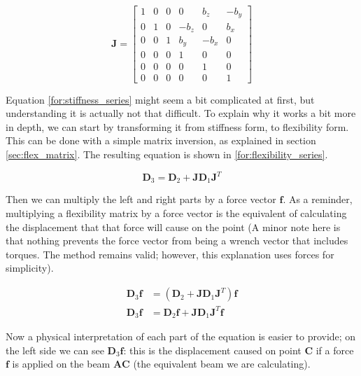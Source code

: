 \begin{equation}
\mathbf{J} = \begin{bmatrix}
1 & 0 & 0 & 0 & b_z & -b_y \\
0 & 1 & 0 & -b_z & 0 & b_x \\
0 & 0 & 1 & b_y & -b_x & 0 \\
0 & 0 & 0 & 1 & 0 & 0 \\
0 & 0 & 0 & 0 & 1 & 0 \\
0 & 0 & 0 & 0 & 0 & 1
\end{bmatrix}
\label{for:stiffness_jac}
\end{equation}


Equation \ref{for:stiffness_series} might seem a bit complicated at first, but understanding it is actually
not that difficult. To explain why it works a bit more in depth, we can start by transforming it 
from stiffness form, to flexibility form. This can be done with a simple matrix inversion, as explained
in section \ref{sec:flex_matrix}. The resulting equation is shown in \ref{for:flexibility_series}.

\begin{equation}
\mathbf{D}_3 = \mathbf{D}_2 + \mathbf{J} \mathbf{D}_1 \mathbf{J}^T
\label{for:flexibility_series}
\end{equation}

\noindent
Then we can multiply the left and right parts by a force vector $\mathbf{f}$. As a reminder, multiplying
a flexibility matrix by a force vector is the equivalent of calculating the displacement that that force
will cause on the point (A minor note here is that nothing prevents the force vector from being a wrench 
vector that includes torques. The method remains valid; however, this explanation uses forces for simplicity).

\begin{equation}
\begin{split}
\mathbf{D}_3 \mathbf{f} &= (\mathbf{D}_2 + \mathbf{J} \mathbf{D}_1 \mathbf{J}^T) \mathbf{f}\\
\mathbf{D}_3 \mathbf{f} &= \mathbf{D}_2 \mathbf{f} + \mathbf{J} \mathbf{D}_1 \mathbf{J}^T \mathbf{f}
\end{split}
\label{for:flexibility_series_mul}
\end{equation}

\noindent
Now a physical interpretation of each part of the equation is easier to provide; on the left side
we can see $\mathbf{D}_3 \mathbf{f}$: this is the displacement caused on point $\mathbf{C}$ if a force $\mathbf{f}$
is applied on the beam $\mathbf{AC}$ (the equivalent beam we are calculating).

